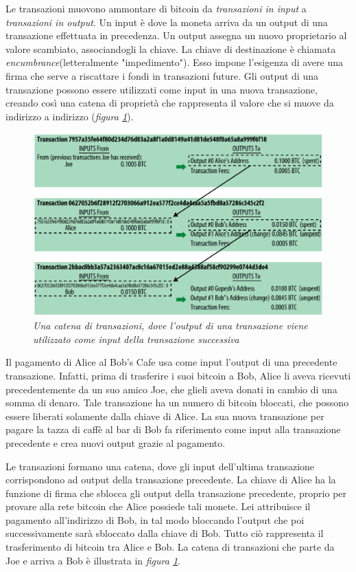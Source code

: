 Le transazioni muovono ammontare di bitcoin da \textit{transazioni in input} a \textit{transazioni in output}. Un input è dove la moneta arriva da un output di una transazione effettuata in precedenza. Un output assegna un nuovo proprietario al valore scambiato, associandogli la chiave. La chiave di destinazione è chiamata \textit{encumbrance}(letteralmente "impedimento"). Esso impone l'esigenza di avere una firma che serve a riscattare i fondi in transazioni future. Gli output di una transazione possono essere utilizzati come input in una nuova transazione, creando così una catena di proprietà che rappresenta il valore che si muove da indirizzo a indirizzo (\textit{figura \ref{fig:chaintxs}}).
\begin{figure}[htbp]
	\centering
	\includegraphics[width=0.7 \linewidth]{figure/chaintxs}
	\caption{\textit{Una catena di transazioni, dove l'output di una transazione viene utilizzato come input della transazione successiva} \label{fig:chaintxs}}
\end{figure}

Il pagamento di Alice al Bob's Cafe usa come input l'output di una precedente transazione. Infatti, prima di trasferire i suoi bitcoin a Bob, Alice li aveva ricevuti precedentemente da un suo amico Joe, che glieli aveva donati in cambio di una somma di denaro. Tale transazione ha un numero di bitcoin bloccati, che possono essere liberati solamente dalla chiave di Alice. La sua nuova transazione per pagare la tazza di caffè al bar di Bob fa riferimento come input alla transazione precedente e crea nuovi output grazie al pagamento. 

Le transazioni formano una catena, dove gli input dell'ultima transazione corrispondono ad output della transazione precedente. La chiave di Alice ha la funzione di firma che sblocca gli output della transazione precedente, proprio per provare alla rete bitcoin che Alice possiede tali monete. Lei attribuisce il pagamento all'indirizzo di Bob, in tal modo bloccando l'output che poi successivamente sarà sbloccato dalla chiave di Bob. Tutto ciò rappresenta il trasferimento di bitcoin tra Alice e Bob. La catena di transazioni che parte da Joe e arriva a Bob è illustrata in \textit{figura \ref{fig:chaintxs}}.\cite{antonopoulos2014mastering}

